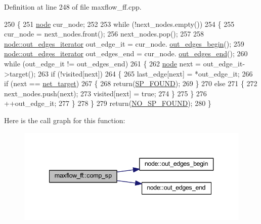 Definition at line 248 of file maxflow\+\_\+ff.\+cpp.


\begin{DoxyCode}
250 \{
251     \mbox{\hyperlink{classnode}{node}} cur\_node;
252 
253     \textcolor{keywordflow}{while} (!next\_nodes.empty())
254     \{
255     cur\_node = next\_nodes.front();
256     next\_nodes.pop();
257         
258     \mbox{\hyperlink{classnode_a90e17ed34de55072e8077f4367499a98}{node::out\_edges\_iterator}} out\_edge\_it = cur\_node.
      \mbox{\hyperlink{classnode_a7dcb80df22118cea04f77ca8c952d9c2}{out\_edges\_begin}}();
259     \mbox{\hyperlink{classnode_a90e17ed34de55072e8077f4367499a98}{node::out\_edges\_iterator}} out\_edges\_end = cur\_node.
      \mbox{\hyperlink{classnode_a7ce2ba5195a63d4df6b44299a02a9378}{out\_edges\_end}}();
260     \textcolor{keywordflow}{while} (out\_edge\_it != out\_edges\_end)
261     \{
262         \mbox{\hyperlink{classnode}{node}} next = out\_edge\_it->target();
263         \textcolor{keywordflow}{if} (!visited[next])
264         \{
265         last\_edge[next] = *out\_edge\_it;
266         \textcolor{keywordflow}{if} (next == \mbox{\hyperlink{classmaxflow__ff_a94d5db73364cf5824ec3d3d530b57319}{net\_target}})
267         \{
268             \textcolor{keywordflow}{return}(\mbox{\hyperlink{classmaxflow__ff_a08dc6e5c5fe20a9f9d93721f8c273592acf4f271b476cce9871e48ba446283d64}{SP\_FOUND}});
269         \}
270         \textcolor{keywordflow}{else}
271         \{
272             next\_nodes.push(next);
273             visited[next] = \textcolor{keyword}{true};
274         \}
275         \}
276         ++out\_edge\_it;
277     \}
278     \}
279     \textcolor{keywordflow}{return}(\mbox{\hyperlink{classmaxflow__ff_a08dc6e5c5fe20a9f9d93721f8c273592adc2a7638ed9e892fb272d6b9e1dda399}{NO\_SP\_FOUND}});
280 \}
\end{DoxyCode}
Here is the call graph for this function\+:\nopagebreak
\begin{figure}[H]
\begin{center}
\leavevmode
\includegraphics[width=340pt]{classmaxflow__ff_afefc972c43e8eb031abaac1451473f9c_cgraph}
\end{center}
\end{figure}
